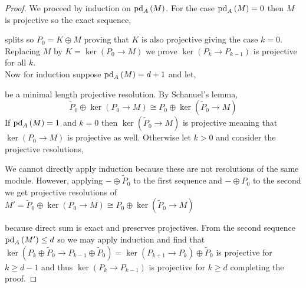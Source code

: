 \documentclass[12pt]{article}
\begin{document}
\begin{proof}
We proceed by induction on $\mathrm{pd}_{A} \left( M \right)$. For the case $\mathrm{pd}_{A} \left( M \right) = 0$ then $M$ is projective so the exact sequence,
\begin{center}
\end{center}
splits so $P_0 = K \oplus M$ proving that $K$ is also projective giving the case $k = 0$. Replacing $M$ by $K = \ker{(P_0 \to M)}$ we prove $\ker{(P_k \to P_{k-1})}$ is projective for all $k$.
\bigskip\\
Now for induction suppose $\mathrm{pd}_{A} \left( M \right) = d + 1$ and let,
\begin{center}
\end{center}
be a minimal length projective resolution. By Schanuel's lemma,
\[ \tilde{P}_0 \oplus \ker{(P_0 \to M)} \cong P_0 \oplus \ker{(\tilde{P}_0 \to M)} \]
If $\mathrm{pd}_{A} \left( M \right) = 1$ and $k = 0$ then $\ker{(\tilde{P}_0 \to M)}$ is projective meaning that $\ker{(P_0 \to M)}$ is projective as well. Otherwise let $k > 0$ and consider the projective resolutions,
\begin{center}
\end{center}
We cannot directly apply induction because these are not resolutions of the same module. However, applying $- \oplus \tilde{P}_0$ to the first sequence and $- \oplus P_0$ to the second we get projective resolutions of $M' = \tilde{P}_0 \oplus \ker{(P_0 \to M)} \cong P_0 \oplus \ker{(\tilde{P}_0 \to M)}$
\begin{center}
\end{center}
because direct sum is exact and preserves projectives. From the second sequence $\mathrm{pd}_{A} \left( M' \right) \le d$ so we may apply induction and find that $\ker{(P_k \oplus \tilde{P}_0 \to P_{k-1} \oplus \tilde{P}_0)} = \ker{(P_{k+1} \to P_{k})} \oplus \tilde{P}_0$ is projective for $k \ge d-1$ and thus $\ker{(P_k \to P_{k-1})}$ is projective for $k \ge d$ completing the proof.
\end{proof}
\end{document}
